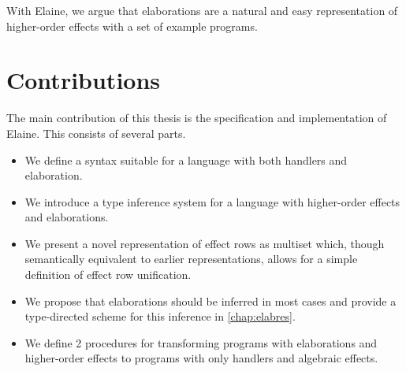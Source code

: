 With Elaine, we argue that elaborations are a natural and easy representation of higher-order effects with a set of example programs.

\section{Contributions}

The main contribution of this thesis is the specification and implementation of Elaine. This consists of several parts.

\begin{itemize}
    \item We define a syntax suitable for a language with both handlers and elaboration.
    \item We introduce a type inference system for a language with higher-order effects and elaborations.
    \item We present a novel representation of effect rows as multiset which, though semantically equivalent to earlier representations, allows for a simple definition of effect row unification.
    \item We propose that elaborations should be inferred in most cases and provide a type-directed scheme for this inference in \cref{chap:elabres}.
    \item We define 2 procedures for transforming programs with elaborations and higher-order effects to programs with only handlers and algebraic effects.
\end{itemize}
